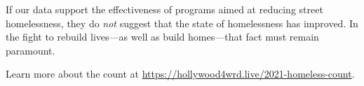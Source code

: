 \documentclass[11pt]{article}
\begin{document}
If our data support the effectiveness of programs aimed at reducing street homelessness, 
they do {\it not} suggest that the state of homelessness has improved. In the fight to rebuild lives---as well 
as build homes---that fact must remain paramount.

Learn more about the count at \url{https://hollywood4wrd.live/2021-homeless-count}.


%


%
%
%

\end{document}
